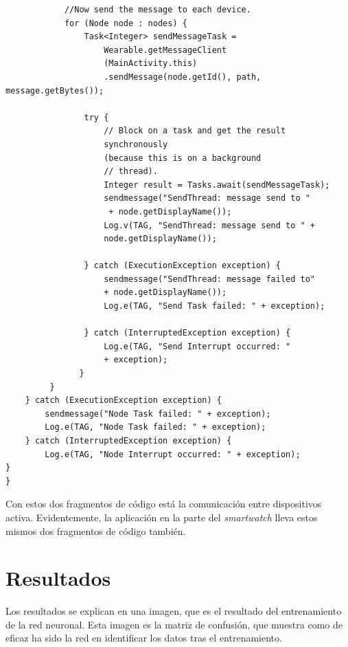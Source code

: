 \documentclass[12pt]{article}
\numberwithin{equation}{section}
\begin{document}
{\begin{lstlisting}
      	    //Now send the message to each device.
            for (Node node : nodes) {
            	Task<Integer> sendMessageTask =
                	Wearable.getMessageClient
                    (MainActivity.this)
                    .sendMessage(node.getId(), path, 			                            					message.getBytes());

                try {
                	// Block on a task and get the result 	
                	synchronously 
                	(because this is on a background
                    // thread).
                    Integer result = Tasks.await(sendMessageTask);
                    sendmessage("SendThread: message send to "
                     + node.getDisplayName());
                    Log.v(TAG, "SendThread: message send to " + 
                    node.getDisplayName());

                } catch (ExecutionException exception) {
                	sendmessage("SendThread: message failed to"
                	+ node.getDisplayName());
                    Log.e(TAG, "Send Task failed: " + exception);

                } catch (InterruptedException exception) {
                    Log.e(TAG, "Send Interrupt occurred: "
                    + exception);
               }
         }
    } catch (ExecutionException exception) {
    	sendmessage("Node Task failed: " + exception);
        Log.e(TAG, "Node Task failed: " + exception);
    } catch (InterruptedException exception) {
        Log.e(TAG, "Node Interrupt occurred: " + exception);
}
}
\end{lstlisting}

Con estos dos fragmentos de código está la comunicación entre dispositivos activa. Evidentemente, la aplicación en la parte del \textit{smartwatch} lleva estos mismos dos fragmentos de código también.

\newpage
\section{Resultados}

Los resultados se explican en una imagen, que es el resultado del entrenamiento de la red neuronal. Esta imagen es la matriz de confusión, que muestra como de eficaz ha sido la red en identificar los datos tras el entrenamiento.


}
\end{document}
